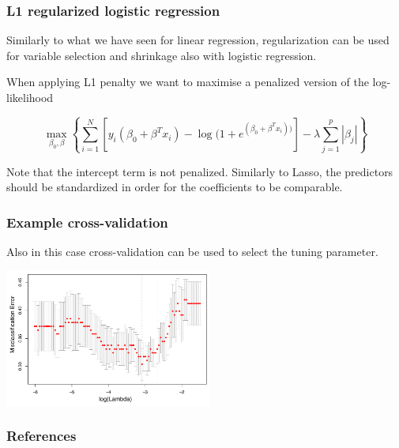 \documentclass[notes]{beamer}          %
\begin{document}
\begin{frame}
\frametitle{L1 regularized logistic regression}

Similarly to what we have seen for linear regression, regularization can be used for variable selection and shrinkage also with logistic regression.

\vspace{5mm} 

When applying L1 penalty we want to maximise a penalized version of the log-likelihood

\begin{equation*}
    \max_{\beta_0, \beta} \left\{ \sum_{i=1}^N [ y_i(\beta_0 + \beta^T x_i) - \log (1+e^{(\beta_0 + \beta^T x_i))}] -\lambda \sum_{j=1}^p | \beta_j| \right\}
\end{equation*}

Note that the intercept term is not penalized. Similarly to Lasso, the predictors should be standardized in order for the coefficients to be comparable.

\end{frame}

\begin{frame}
\frametitle{Example cross-validation}

Also in this case cross-validation can be used to select the tuning parameter.

\begin{center}
\includegraphics[height=4.5cm]{../figures/week_2_linear_models/GDSC_logistic_regression_cross_validation.pdf}
\end{center}

\end{frame}


\begin{frame}
\frametitle{References}
\printbibliography
\end{frame}
\end{document}
